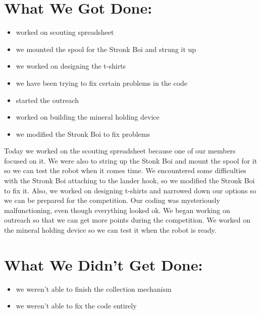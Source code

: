 \documentclass[12pt]{article}
\begin{document}
\section{What We Got Done:} %
\begin{itemize}
	\item worked on scouting spreadsheet
\item we mounted the spool for the Stronk Boi and strung it up
\item we worked on designing the t-shirts
\item we have been trying to fix certain problems in the code
\item started the outreach
\item worked on building the mineral holding device
\item we modified the Stronk Boi to fix problems
\end{itemize}

Today we worked on the scouting spreadsheet because one of our members focused on it. We were also to string up the Stonk Boi and mount the spool for it so we can test the robot when it comes time. We encountered some difficulties with the Stronk Boi attaching to the lander hook, so we modified the Stronk Boi to fix it. Also, we worked on designing t-shirts and narrowed down our options so we can be prepared for the competition. Our coding was mysteriously malfunctioning, even though everything looked ok. We began working on outreach so that we can get more points during the competition. We worked on the mineral holding device so we can test it when the robot is ready.

\section{What We Didn't Get Done:} %
\begin{itemize}
	\item we weren’t able to finish the collection mechanism
\item we weren’t able to fix the code entirely
\end{itemize}
\end{document}
